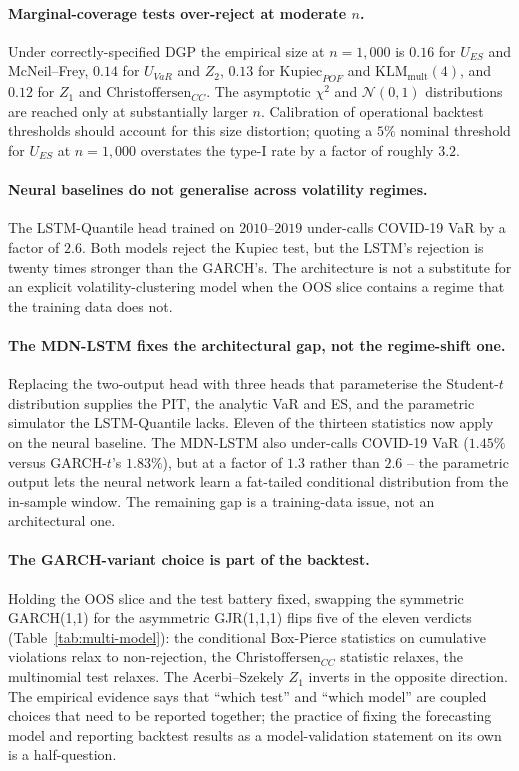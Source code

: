 \documentclass[11pt,a4paper]{article}
\theoremstyle{plain}
\begin{document}
\paragraph{Marginal-coverage tests over-reject at moderate $n$.} Under
correctly-specified DGP the empirical size at $n = 1{,}000$ is $0.16$
for $U_{ES}$ and McNeil--Frey, $0.14$ for $U_{VaR}$ and $Z_2$, $0.13$
for $\mathrm{Kupiec}_{POF}$ and $\mathrm{KLM}_{\text{mult}}(4)$, and
$0.12$ for $Z_1$ and $\mathrm{Christoffersen}_{CC}$. The asymptotic
$\chi^2$ and $\mathcal{N}(0,1)$ distributions are reached only at
substantially larger $n$. Calibration of operational backtest
thresholds should account for this size distortion; quoting a $5\%$
nominal threshold for $U_{ES}$ at $n = 1{,}000$ overstates the
type-I rate by a factor of roughly $3.2$.

\paragraph{Neural baselines do not generalise across volatility
regimes.} The LSTM-Quantile head trained on $2010$--$2019$
under-calls COVID-19 VaR by a factor of $2.6$. Both models reject
the Kupiec test, but the LSTM's rejection is twenty times stronger
than the GARCH's. The architecture is not a substitute for an
explicit volatility-clustering model when the OOS slice contains a
regime that the training data does not.

\paragraph{The MDN-LSTM fixes the architectural gap, not the
regime-shift one.} Replacing the two-output head with three heads
that parameterise the Student-$t$ distribution supplies the PIT,
the analytic VaR and ES, and the parametric simulator the
LSTM-Quantile lacks. Eleven of the thirteen statistics now apply
on the neural baseline. The MDN-LSTM also under-calls COVID-19 VaR
($1.45\%$ versus GARCH-$t$'s $1.83\%$), but at a factor of $1.3$
rather than $2.6$ -- the parametric output lets the neural network
learn a fat-tailed conditional distribution from the in-sample
window. The remaining gap is a training-data issue, not an
architectural one.

\paragraph{The GARCH-variant choice is part of the backtest.} Holding
the OOS slice and the test battery fixed, swapping the symmetric
GARCH(1,1) for the asymmetric GJR(1,1,1) flips five of the eleven
verdicts (Table~\ref{tab:multi-model}): the conditional Box-Pierce
statistics on cumulative violations relax to non-rejection, the
$\mathrm{Christoffersen}_{CC}$ statistic relaxes, the multinomial
test relaxes. The Acerbi--Szekely $Z_1$ inverts in the opposite
direction. The empirical evidence says that ``which test'' and
``which model'' are coupled choices that need to be reported
together; the practice of fixing the forecasting model and reporting
backtest results as a model-validation statement on its own is a
half-question.
\end{document}

